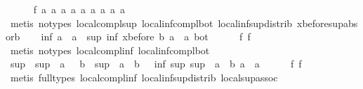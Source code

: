 \begin{isabellebody}
\ \ \ \ \isamarkupfalse%
\ f{}{}\ a{}\ a{}\ a{}\ a{}\ a{}\ a{}\ a{}\ a{}\ a{}\ \isamarkupfalse%
\ {\isacharparenleft}metis\ {\isacharparenleft}no{\isacharunderscore}types{\isacharparenright}\ local{\isachardot}compl{\isacharunderscore}sup\ local{\isachardot}inf{\isacharunderscore}compl{\isacharunderscore}bot\ local{\isachardot}inf{\isacharunderscore}sup{\isacharunderscore}distrib{}\ xbefore{\isacharunderscore}sup{\isacharunderscore}absorb{\isacharunderscore}{}{\isacharparenright}\isanewline
\ \ \isamarkupfalse%
\ {\isachardoublequoteopen}inf\ a\ {\isacharparenleft}{\isacharminus}\ a{\isacharparenright}\ {\isacharequal}\ sup\ {\isacharparenleft}inf\ {\isacharparenleft}xbefore\ b\ a{\isacharparenright}\ {\isacharparenleft}{\isacharminus}\ a{\isacharparenright}{\isacharparenright}\ bot{\isachardoublequoteclose}\isanewline
\ \ \ \ \isamarkupfalse%
\ f{}{}\ f{}{}\ \isamarkupfalse%
\ {\isacharparenleft}metis\ {\isacharparenleft}no{\isacharunderscore}types{\isacharparenright}\ local{\isachardot}compl{\isacharunderscore}inf\ local{\isachardot}inf{\isacharunderscore}compl{\isacharunderscore}bot{\isacharparenright}\isanewline
\ \ \isamarkupfalse%
\ \isamarkupfalse%
\ {\isachardoublequoteopen}sup\ {\isacharparenleft}{\isacharminus}\ sup\ {\isacharparenleft}{\isacharminus}\ a{\isacharparenright}\ {\isacharparenleft}{\isacharminus}\ {\isacharparenleft}{\isacharminus}\ b{\isacharparenright}{\isacharparenright}{\isacharparenright}\ {\isacharparenleft}{\isacharminus}\ sup\ {\isacharparenleft}{\isacharminus}\ a{\isacharparenright}\ {\isacharparenleft}{\isacharminus}\ b{\isacharparenright}{\isacharparenright}\ {\isacharequal}\ {\isacharminus}\ inf\ {\isacharparenleft}sup\ {\isacharparenleft}sup\ {\isacharparenleft}{\isacharminus}\ a{\isacharparenright}\ {\isacharparenleft}{\isacharminus}\ b{\isacharparenright}{\isacharparenright}\ a{\isacharparenright}\ {\isacharparenleft}{\isacharminus}\ a{\isacharparenright}{\isachardoublequoteclose}\isanewline
\ \ \ \ \isamarkupfalse%
\ f{}{}\ f{}{}\ \isamarkupfalse%
\ {\isacharparenleft}metis\ {\isacharparenleft}full{\isacharunderscore}types{\isacharparenright}\ local{\isachardot}compl{\isacharunderscore}inf\ local{\isachardot}inf{\isacharunderscore}sup{\isacharunderscore}distrib{}\ local{\isachardot}sup{\isacharunderscore}assoc{\isacharparenright}\isanewline

\end{isabellebody}
